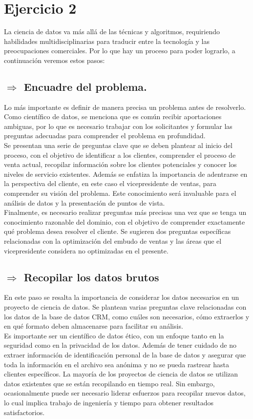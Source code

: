 \section*{Ejercicio 2}
\noindent La ciencia de datos va más allá de las técnicas y algoritmos, requiriendo habilidades multidisciplinarias para traducir entre la tecnología y las preocupaciones comerciales. Por lo que hay un proceso para poder lograrlo, a continuación veremos estos pasos:

\subsection*{$\Rightarrow$ Encuadre del problema.}
\noindent Lo más importante es definir de manera precisa un problema antes de resolverlo. Como científico de datos, se menciona que es común recibir aportaciones ambiguas, por lo que es necesario trabajar con los solicitantes y formular las preguntas adecuadas para comprender el problema en profundidad.\\
Se presentan una serie de preguntas clave que se deben plantear al inicio del proceso, con el objetivo de identificar a los clientes, comprender el proceso de venta actual, recopilar información sobre los clientes potenciales y conocer los niveles de servicio existentes.
Además se enfatiza la importancia de adentrarse en la perspectiva del cliente, en este caso el vicepresidente de ventas, para comprender su visión del problema. Este conocimiento será invaluable para el análisis de datos y la presentación de puntos de vista.\\
Finalmente, es necesario realizar preguntas más precisas una vez que se tenga un conocimiento razonable del dominio, con el objetivo de comprender exactamente qué problema desea resolver el cliente. Se sugieren dos preguntas específicas relacionadas con la optimización del embudo de ventas y las áreas que el vicepresidente considera no optimizadas en el presente.

\subsection*{$\Rightarrow$ Recopilar los datos brutos}
\noindent En este paso se resalta la importancia de considerar los datos necesarios en un proyecto de ciencia de datos. Se plantean varias preguntas clave relacionadas con los datos de la base de datos CRM, como cuáles son necesarios, cómo extraerlos y en qué formato deben almacenarse para facilitar su análisis.\\
Es importante ser un científico de datos ético, con un enfoque tanto en la seguridad como en la privacidad de los datos. Además de tener cuidado de no extraer información de identificación personal de la base de datos y asegurar que toda la información en el archivo sea anónima y no se pueda rastrear hasta clientes específicos. La mayoría de los proyectos de ciencia de datos se utilizan datos existentes que se están recopilando en tiempo real. Sin embargo, ocasionalmente puede ser necesario liderar esfuerzos para recopilar nuevos datos, lo cual implica trabajo de ingeniería y tiempo para obtener resultados satisfactorios.

